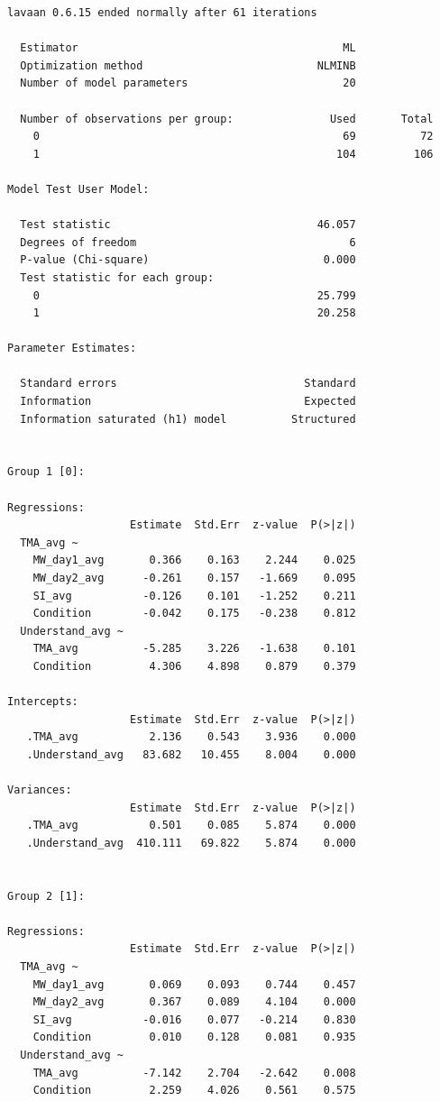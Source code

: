 \documentclass[
  letterpaper,
  DIV=11,
  numbers=noendperiod]{scrartcl}
\begin{document}
\begin{verbatim}
lavaan 0.6.15 ended normally after 61 iterations

  Estimator                                         ML
  Optimization method                           NLMINB
  Number of model parameters                        20

  Number of observations per group:               Used       Total
    0                                               69          72
    1                                              104         106

Model Test User Model:
                                                      
  Test statistic                                46.057
  Degrees of freedom                                 6
  P-value (Chi-square)                           0.000
  Test statistic for each group:
    0                                           25.799
    1                                           20.258

Parameter Estimates:

  Standard errors                             Standard
  Information                                 Expected
  Information saturated (h1) model          Structured


Group 1 [0]:

Regressions:
                   Estimate  Std.Err  z-value  P(>|z|)
  TMA_avg ~                                           
    MW_day1_avg       0.366    0.163    2.244    0.025
    MW_day2_avg      -0.261    0.157   -1.669    0.095
    SI_avg           -0.126    0.101   -1.252    0.211
    Condition        -0.042    0.175   -0.238    0.812
  Understand_avg ~                                    
    TMA_avg          -5.285    3.226   -1.638    0.101
    Condition         4.306    4.898    0.879    0.379

Intercepts:
                   Estimate  Std.Err  z-value  P(>|z|)
   .TMA_avg           2.136    0.543    3.936    0.000
   .Understand_avg   83.682   10.455    8.004    0.000

Variances:
                   Estimate  Std.Err  z-value  P(>|z|)
   .TMA_avg           0.501    0.085    5.874    0.000
   .Understand_avg  410.111   69.822    5.874    0.000


Group 2 [1]:

Regressions:
                   Estimate  Std.Err  z-value  P(>|z|)
  TMA_avg ~                                           
    MW_day1_avg       0.069    0.093    0.744    0.457
    MW_day2_avg       0.367    0.089    4.104    0.000
    SI_avg           -0.016    0.077   -0.214    0.830
    Condition         0.010    0.128    0.081    0.935
  Understand_avg ~                                    
    TMA_avg          -7.142    2.704   -2.642    0.008
    Condition         2.259    4.026    0.561    0.575


\end{verbatim}
\end{document}
